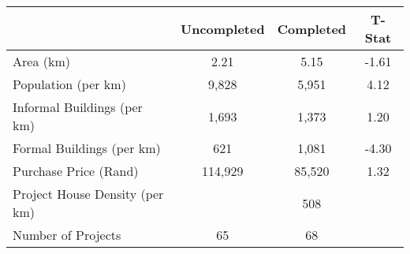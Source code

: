 \begin{tabular}{l*{1}{ccc}}
 &Uncompleted &Completed &T-Stat  \\
\hline 
Area (km) &       2.21 &       5.15 &      -1.61  \\
Population (per km) &      9,828 &      5,951 &       4.12  \\
Informal Buildings (per km) &      1,693 &      1,373 &       1.20  \\
Formal Buildings (per km) &        621 &      1,081 &      -4.30  \\
Purchase Price (Rand) &    114,929 &     85,520 &       1.32  \\
Project House Density (per km) &    &  508 &   \\
Number of Projects &         65 &         68 &   \\
\hline
\end{tabular}